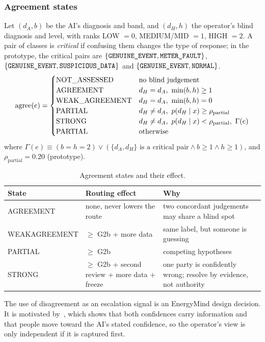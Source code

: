\documentclass[11pt,a4paper]{article}
\renewcommand{\_}{\textunderscore\allowbreak}
\providecommand{\GE}{\texttt{GENUINE\_EVENT}}
\providecommand{\MF}{\texttt{METER\_FAULT}}
\providecommand{\SD}{\texttt{SUSPICIOUS\_DATA}}
\providecommand{\NORM}{\texttt{NORMAL}}
\newcommand{\lvl}[1]{\textsf{#1}}
\begin{document}
\subsubsection{Agreement states}
Let $(d_A,b)$ be the AI's diagnosis and band, and $(d_H,h)$ the operator's blind diagnosis and level, with ranks
LOW $=0$, MEDIUM/MID $=1$, HIGH $=2$. A pair of classes is \emph{critical} if confusing them changes the type of
response; in the prototype, the critical pairs are $\{\GE,\MF\}$, $\{\GE,\SD\}$ and $\{\GE,\NORM\}$.
\begin{equation}
\mathrm{agree}(e)=\begin{cases}
\text{NOT\_ASSESSED} & \text{no blind judgement}\\
\text{AGREEMENT} & d_H=d_A,\ \min(b,h)\ge1\\
\text{WEAK\_AGREEMENT} & d_H=d_A,\ \min(b,h)=0\\
\text{PARTIAL} & d_H\ne d_A,\ p(d_H\mid x)\ge\rho_{\mathrm{partial}}\\
\text{STRONG} & d_H\ne d_A,\ p(d_H\mid x)<\rho_{\mathrm{partial}},\ \Gamma(e)\\
\text{PARTIAL} & \text{otherwise}
\end{cases}
\end{equation}
where $\Gamma(e)\equiv(b=h=2)\lor(\{d_A,d_H\}\text{ is a critical pair}\land b\ge1\land h\ge1)$, and
$\rho_{\mathrm{partial}}=0.20$ (prototype).

\begin{table}[H]
\centering\small
\begin{tabularx}{\textwidth}{@{}>{\raggedright\arraybackslash}p{3.2cm}>{\raggedright\arraybackslash}p{5.2cm}L@{}}
\toprule
\textbf{State} & \textbf{Routing effect} & \textbf{Why} \\
\midrule
AGREEMENT & none, never lowers the route & two concordant judgements may share a blind spot \\
WEAK\_AGREEMENT & $\ge$ \lvl{G2b} + more data & same label, but someone is guessing \\
PARTIAL & $\ge$ \lvl{G2b} & competing hypotheses \\
STRONG & $\ge$ \lvl{G2b} + second review + more data + freeze & one party is confidently wrong; resolve by evidence, not authority \\
\bottomrule
\end{tabularx}
\caption{Agreement states and their effect.}
\end{table}
The use of disagreement as an escalation signal is an EnergyMind design decision. It is motivated
by~\cite{benz}, which shows that both confidences carry information and that people move toward the AI's stated
confidence, so the operator's view is only independent if it is captured first.
\end{document}
